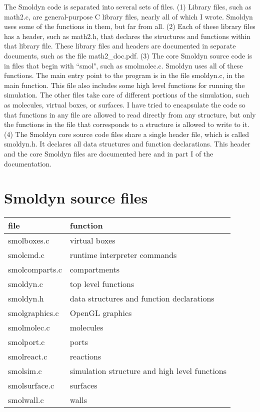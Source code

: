 \documentclass {scrbook}
\begin{document}
The Smoldyn code is separated into several sets of files. (1) Library files, such as math2.c, are general-purpose C library files, nearly all of which I wrote. Smoldyn uses some of the functions in them, but far from all. (2) Each of these library files has a header, such as math2.h, that declares the structures and functions within that library file. These library files and headers are documented in separate documents, such as the file math2\_doc.pdf. (3) The core Smoldyn source code is in files that begin with ``smol", such as smolmolec.c. Smoldyn uses all of these functions. The main entry point to the program is in the file smoldyn.c, in the main function. This file also includes some high level functions for running the simulation. The other files take care of different portions of the simulation, such as molecules, virtual boxes, or surfaces. I have tried to encapsulate the code so that functions in any file are allowed to read directly from any structure, but only the functions in the file that corresponds to a structure is allowed to write to it. (4) The Smoldyn core source code files share a single header file, which is called smoldyn.h. It declares all data structures and function declarations. This header and the core Smoldyn files are documented here and in part I of the documentation.

\section{Smoldyn source files}

\begin{longtable}[c]{ll}
file & function\\
\hline
smolboxes.c & virtual boxes\\
smolcmd.c & runtime interpreter commands\\
smolcomparts.c & compartments\\
smoldyn.c & top level functions\\
smoldyn.h & data structures and function declarations\\
smolgraphics.c & OpenGL graphics\\
smolmolec.c & molecules\\
smolport.c & ports\\
smolreact.c & reactions\\
smolsim.c & simulation structure and high level functions\\
smolsurface.c & surfaces\\
smolwall.c & walls\\
\end{longtable}
\end{document}

